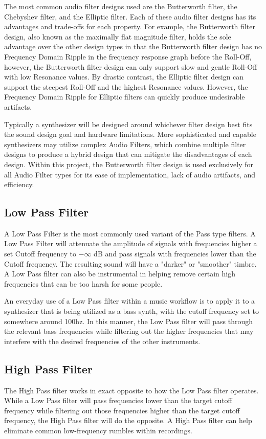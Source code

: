 \documentclass[a4paper,12pt]{report}
\begin{document}
The most common audio filter designs used are the Butterworth filter, the Chebyshev filter, and the Elliptic filter. Each of these audio filter designs has its advantages and trade-offs for each property. For example, the Butterworth filter design, also known as the maximally flat magnitude filter, holds the sole advantage over the other design types in that the Butterworth filter design has no Frequency Domain Ripple in the frequency response graph before the Roll-Off, however, the Butterworth filter design can only support slow and gentle Roll-Off with low Resonance values. By drastic contrast, the Elliptic filter design can support the steepest Roll-Off and the highest Resonance values. However, the Frequency Domain Ripple for Elliptic filters can quickly produce undesirable artifacts.

Typically a synthesizer will be designed around whichever filter design best fits the sound design goal and hardware limitations. More sophisticated and capable synthesizers may utilize complex Audio Filters, which combine multiple filter designs to produce a hybrid design that can mitigate the disadvantages of each design. Within this project, the Butterworth filter design is used exclusively for all Audio Filter types for its ease of implementation, lack of audio artifacts, and efficiency.

\subsection{Low Pass Filter}
A Low Pass Filter is the most commonly used variant of the Pass type filters. A Low Pass Filter will attenuate the amplitude of signals with frequencies higher a set Cutoff frequency to $-\infty$ dB and pass signals with frequencies lower than the Cutoff frequency. The resulting sound will have a "darker" or "smoother" timbre. A Low Pass filter can also be instrumental in helping remove certain high frequencies that can be too harsh for some people.

An everyday use of a Low Pass filter within a music workflow is to apply it to a synthesizer that is being utilized as a bass synth, with the cutoff frequency set to somewhere around 100hz. In this manner, the Low Pass filter will pass through the relevant bass frequencies while filtering out the higher frequencies that may interfere with the desired frequencies of the other instruments.

\subsection{High Pass Filter}
The High Pass filter works in exact opposite to how the Low Pass filter operates. While a Low Pass filter will pass frequencies lower than the target cutoff frequency while filtering out those frequencies higher than the target cutoff frequency, the High Pass filter will do the opposite. A High Pass filter can help eliminate common low-frequency rumbles within recordings.
\end{document}
